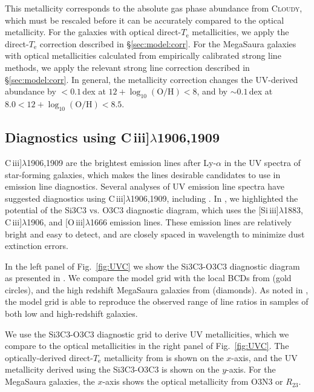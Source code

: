 \documentclass[preprint2]{aastex62}
\newcommand{\Cloudy}{\textsc{Cloudy}\xspace}
\newcommand{\oiii}{[O\,{\sc iii}]\xspace}
\newcommand{\SiuIII}{[Si\,{\sc iii}]\xspace}
\newcommand{\ciii}{C\,{\sc iii}]\xspace}
\newcommand\vs{\ensuremath{\mathrm{vs.}}\xspace}
\newcommand{\logten}{\ensuremath{\log_{10}}}
\newcommand{\logOH}{\ensuremath{\logten (\mathrm{O}/\mathrm{H})}\xspace}
\newcommand{\mage}{{\sc Meg}a{\sc S}a{\sc ura}\xspace}
\newcommand{\Te}{\ensuremath{T_{\mathrm{e}}}\xspace}
\begin{document}
This metallicity corresponds to the absolute gas phase abundance from \Cloudy, which must be rescaled before it can be accurately compared to the optical metallicity. For the \citet{Berg+2016} galaxies with optical direct-\Te metallicities, we apply the direct-\Te correction described in \S\ref{sec:model:corr}. For the \mage galaxies with optical metallicities calculated from empirically calibrated strong line methods, we apply the relevant strong line correction described in \S\ref{sec:model:corr}. In general, the metallicity correction changes the UV-derived abundance by $<0.1$\,dex at $12 + \logOH < 8$, and by ${\sim}0.1$\,dex at $8.0 < 12 + \logOH < 8.5$.

\subsection{Diagnostics using \ciii$\lambda$1906,1909}\label{sec:UVOpt:C}

\ciii$\lambda$1906,1909 are the brightest emission lines after Ly-$\alpha$ in the UV spectra of star-forming galaxies, which makes the lines desirable candidates to use in emission line diagnostics. Several analyses of UV emission line spectra have suggested diagnostics using \ciii$\lambda$1906,1909, including \citet{Feltre+2016, Jaskot+2016, Byler+2018}. In \citet{Byler+2018}, we highlighted the potential of the Si3C3 \vs O3C3 diagnostic diagram, which uses the \SiuIII$\lambda$1883, \ciii$\lambda$1906, and \oiii$\lambda$1666 emission lines. These emission lines are relatively bright and easy to detect, and are closely spaced in wavelength to minimize dust extinction errors. 

In the left panel of Fig.~\ref{fig:UVC} we show the Si3C3-O3C3 diagnostic diagram as presented in \citet{Byler+2018}. We compare the model grid with the local BCDs from \citet{Berg+2016} (gold circles), and the high redshift \mage galaxies from \citet{Rigby+2018b} (diamonds). As noted in \citet{Byler+2018}, the model grid is able to reproduce the observed range of line ratios in samples of both low and high-redshift galaxies.

We use the Si3C3-O3C3 diagnostic grid to derive UV metallicities, which we compare to the optical metallicities in the right panel of Fig.~\ref{fig:UVC}. The optically-derived direct-\Te metallicity from \citet{Berg+2016} is shown on the $x$-axis, and the UV metallicity derived using the Si3C3-O3C3 is shown on the $y$-axis. For the \mage galaxies, the $x$-axis shows the optical metallicity from O3N3 or $R_{23}$.
\end{document}
